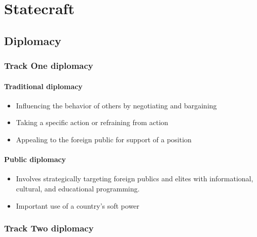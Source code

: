 \documentclass[
]{book}
\begin{document}
\hypertarget{statecraft}{%
\section{Statecraft}\label{statecraft}}

\hypertarget{diplomacy}{%
\subsection{Diplomacy}\label{diplomacy}}

\hypertarget{track-one-diplomacy}{%
\subsubsection{Track One diplomacy}\label{track-one-diplomacy}}

\hypertarget{traditional-diplomacy}{%
\paragraph{Traditional diplomacy}\label{traditional-diplomacy}}

\begin{itemize}
\item
  Influencing the behavior of others by negotiating and bargaining
\item
  Taking a specific action or refraining from action
\item
  Appealing to the foreign public for support of a position
\end{itemize}

\hypertarget{public-diplomacy}{%
\paragraph{Public diplomacy}\label{public-diplomacy}}

\begin{itemize}
\item
  Involves strategically targeting foreign publics and elites with informational, cultural, and educational programming.
\item
  Important use of a country's soft power
\end{itemize}

\hypertarget{track-two-diplomacy}{%
\subsubsection{Track Two diplomacy}\label{track-two-diplomacy}}
\end{document}
